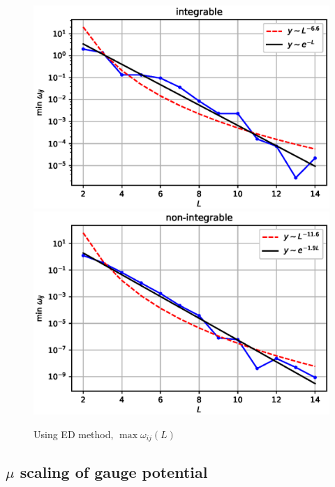 \documentclass[11pt,a4paper]{article}
\begin{document}
\begin{figure}[!ht]
\begin{center}
\includegraphics[scale=0.7]{new_pics/v2_minwij_int.eps}\\
\includegraphics[scale=0.7]{new_pics/v2_minwij_nonint.eps}
\caption{Using ED method,  $\max \omega_{ij}(L)$}
\end{center}
\end{figure}



\subsection{$\mu$ scaling of gauge potential}
\end{document}
